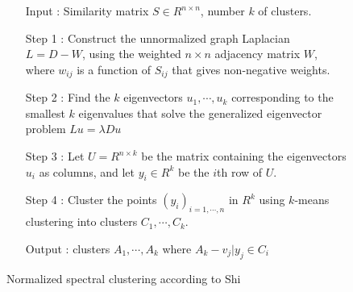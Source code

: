 \begin{figure}[ht]
\begin{mdframed}
\begin{enumerate}
\item[Input] : Similarity matrix $S \in R^{n \times n}$, number $k$ of clusters. \\
\item[Step 1] : Construct the unnormalized graph Laplacian $L = D - W$, using the weighted $n \times n$ adjacency matrix $W$, where $w_{ij}$ is a function of $S_{ij}$ that gives non-negative weights. \\
\item[Step 2] : Find the $k$ eigenvectors $u_1, \cdots, u_k$ corresponding to the smallest $k$ eigenvalues that solve the generalized eigenvector problem $L u = \lambda D u$ \\
\item[Step 3] : Let $U = R^{n \times k}$ be the matrix containing the eigenvectors $u_i$ as columns, and let $y_i \in R^k$ be the $i$th row of $U$.\\
\item[Step 4] : Cluster the points $(y_i)_{i=1,\cdots,n}$ in $R^k$ using $k$-means clustering into clusters $C_1,\cdots,C_k$.\\
\item[Output] : clusters $A_1, \cdots, A_k$ where $A_k - {v_j|y_j \in C_i}$
\end{enumerate}
\end{mdframed}
\caption{Normalized spectral clustering according to Shi}
\end{figure}

